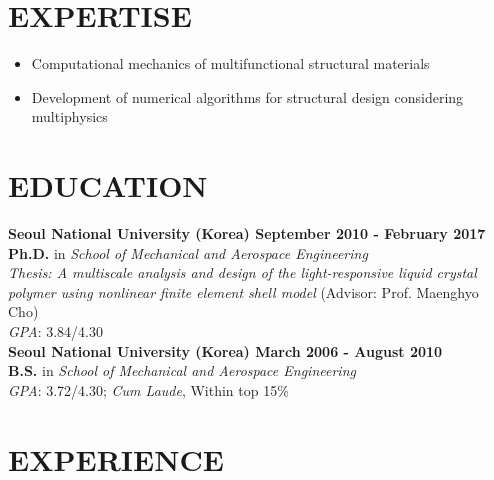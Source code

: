 \documentclass[margin, 10pt]{res} %
\begin{document}
\begin{resume}

 
\section{EXPERTISE}  
\begin{itemize}
    \item Computational mechanics of multifunctional structural materials 
    \item Development of numerical algorithms for structural design considering \\ multiphysics 
\end{itemize}
    
\section{EDUCATION}

\textbf{Seoul National University (Korea) \hfill September 2010 - February 2017} \\
\textbf{Ph.D.} in \textit{School of Mechanical and Aerospace Engineering} \\ 
\textit{Thesis: A multiscale analysis and design of the light-responsive liquid crystal polymer using nonlinear finite element shell model} (Advisor: Prof. Maenghyo Cho)\\ 
\textit{GPA}: 3.84/4.30 \\

\textbf{Seoul National University (Korea) \hfill March 2006 - August 2010} \\
\textbf{B.S.} in \textit{School of Mechanical and Aerospace Engineering} \\
\textit{GPA}: 3.72/4.30; \textit{Cum Laude}, Within top 15\% \\

\section{EXPERIENCE} 


\end{resume}
\end{document}
